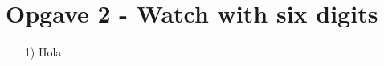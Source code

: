 \section{Opgave 2 - Watch with six digits}
\begin{enumerate}
	\item[1)]
	Hola
	
	
	\begin{lstlisting}[caption={VHDL code for binary circular watch},label={lst:Watch}]
	
	
	\end{lstlisting}
\end{enumerate}